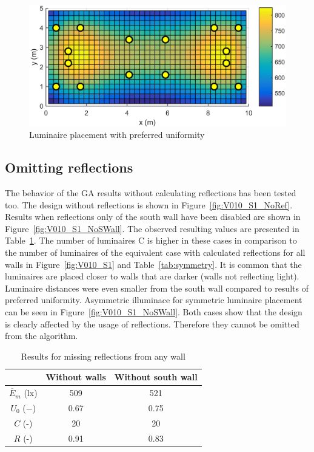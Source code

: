 \begin{figure}[tb]
  \centering
  \includegraphics[width=\columnwidth]{../Vysledky/MSTR_SLB_4x18W_5G4_Fit2_U_V010_S1}
  \caption{Luminaire placement with preferred uniformity}
  \label{fig:V010_S1_U}
\end{figure}

\subsection{Omitting reflections}

The behavior of the GA results without calculating reflections has been tested too. The design without reflections is shown in Figure~\ref{fig:V010_S1_NoRef}. Results when reflections only of the south wall have been disabled are shown in Figure~\ref{fig:V010_S1_NoSWall}. The observed resulting values are presented in Table~\ref{tab:noRef}. The number of luminaires C is higher in these cases in comparison to the number of luminaires of the equivalent case with calculated reflections for all walls in Figure~\ref{fig:V010_S1} and Table~\ref{tab:symmetry}. It is common that the luminaires are placed closer to walls that are darker (walls not reflecting light). Luminaire distances were even smaller from the south wall compared to results of preferred uniformity. Asymmetric illuminace for symmetric luminaire placement can be seen in Figure~\ref{fig:V010_S1_NoSWall}. Both cases show that the design is clearly affected by the usage of reflections. Therefore they cannot be omitted from the algorithm.

\begin{table}[b]
	\renewcommand{\arraystretch}{1.3}
	\caption{Results for missing reflections from any wall}
 	\label{tab:noRef}
	\centering
  \begin{tabular}{| c | c | c |}
    \hline
    & \textbf{Without walls} & \textbf{Without south wall} \\
    \hline
    $\overline{E}_{m}$ (lx) & 509 & 521 \\
    \hline
		$U_0$ ($-$)& 0.67 & 0.75 \\
    \hline
		$C$ (-) & 20 & 20 \\
	\hline
		$R$ (-) & 0.91 & 0.83 \\
  \hline
  \end{tabular}
\end{table}

